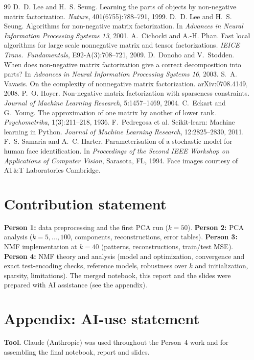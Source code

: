 \documentclass[10pt]{article}
\begin{document}
\clearpage
\begin{thebibliography}{99}\small
{} D.~D. Lee and H.~S. Seung. Learning the parts of objects by non-negative matrix factorization. \emph{Nature}, 401(6755):788--791, 1999.
 D.~D. Lee and H.~S. Seung. Algorithms for non-negative matrix factorization. In \emph{Advances in Neural Information Processing Systems 13}, 2001.
 A.~Cichocki and A.-H. Phan. Fast local algorithms for large scale nonnegative matrix and tensor factorizations. \emph{IEICE Trans.\ Fundamentals}, E92-A(3):708--721, 2009.
 D.~Donoho and V.~Stodden. When does non-negative matrix factorization give a correct decomposition into parts? In \emph{Advances in Neural Information Processing Systems 16}, 2003.
 S.~A. Vavasis. On the complexity of nonnegative matrix factorization. arXiv:0708.4149, 2008.
 P.~O. Hoyer. Non-negative matrix factorization with sparseness constraints. \emph{Journal of Machine Learning Research}, 5:1457--1469, 2004.
 C.~Eckart and G.~Young. The approximation of one matrix by another of lower rank. \emph{Psychometrika}, 1(3):211--218, 1936.
 F.~Pedregosa et al. Scikit-learn: Machine learning in Python. \emph{Journal of Machine Learning Research}, 12:2825--2830, 2011.
 F.~S. Samaria and A.~C. Harter. Parameterisation of a stochastic model for human face identification. In \emph{Proceedings of the Second IEEE Workshop on Applications of Computer Vision}, Sarasota, FL, 1994. Face images courtesy of AT\&T Laboratories Cambridge.
\end{thebibliography}

\section*{Contribution statement}
\small
\textbf{Person 1:} data preprocessing and the first PCA run ($k=50$). \textbf{Person 2:} PCA analysis ($k=5,\dots,100$, components, reconstructions, error tables). \textbf{Person 3:} NMF implementation at $k=40$ (patterns, reconstructions, train/test MSE). \textbf{Person 4:} NMF theory and analysis (model and optimization, convergence and exact test-encoding checks, reference models, robustness over $k$ and initialization, sparsity, limitations). The merged notebook, this report and the slides were prepared with AI assistance (see the appendix).

\clearpage
\section*{Appendix: AI-use statement}
\small
\textbf{Tool.} Claude (Anthropic) was used throughout the Person~4 work and for assembling the final notebook, report and slides.
\end{document}
